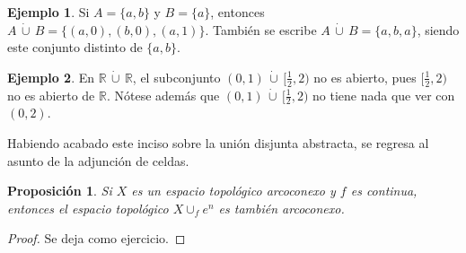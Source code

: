 \documentclass[11pt]{report}
\newtheorem{proposition}{Proposición}[chapter]
\theoremstyle{definition}
\theoremstyle{definition}
\newtheorem{example}{Ejemplo}[chapter]
\theoremstyle{remark}
\newcommand{\R}{\mathbb R}
\begin{document}
\begin{example}
Si $A = \{a,b\}$ y $B = \{a\}$, entonces $A \, \dot\cup \, B = \{(a,0),(b,0),(a,1)\}$. También se escribe $A \, \dot\cup \, B = \{a,b,a\}$, siendo este conjunto distinto de $\{a,b\}$.
\end{example}

\begin{example}
En $\R \, \dot\cup \, \R$, el subconjunto $(0,1) \, \dot\cup \, [\frac{1}{2},2)$ no es abierto, pues $[\frac{1}{2},2)$ no es abierto de $\R$. Nótese además que $(0,1) \, \dot\cup \, [\frac{1}{2},2)$ no tiene nada que ver con $(0,2)$.
\end{example}

Habiendo acabado este inciso sobre la unión disjunta abstracta, se regresa al asunto de la adjunción de celdas.

\begin{proposition}
Si $X$ es un espacio topológico arcoconexo y $f$ es continua, entonces el espacio topológico $X \cup_f e^n$ es también arcoconexo.
\end{proposition}

\begin{proof}
Se deja como ejercicio.
\end{proof}
\end{document}
